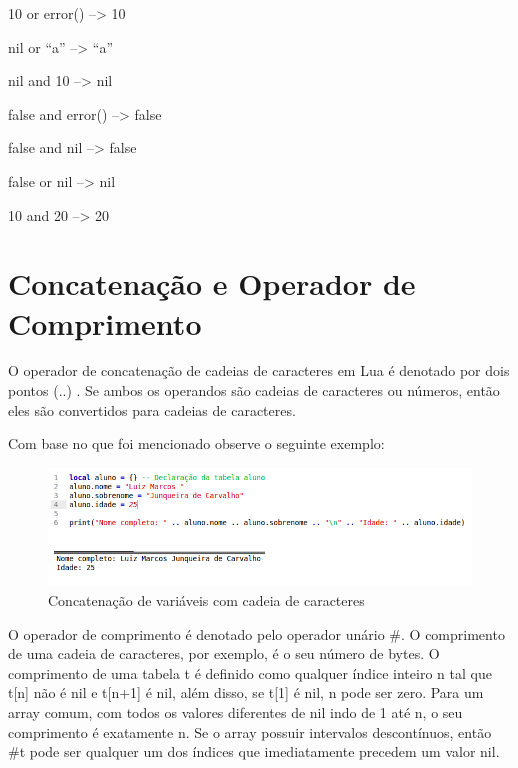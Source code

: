 \documentclass[
12pt, %
openright, %
oneside, %
a4paper, %
english, %
brazil, %
]{abntex2}
\begin{document}
10 or error()       --> 10

nil or ``a''        --> ``a''

nil and 10          --> nil

false and error()   --> false

false and nil       --> false

false or nil        --> nil

10 and 20           --> 20

\section{Concatenação e Operador de Comprimento}
O operador de concatenação de cadeias de caracteres em Lua é denotado por dois pontos (..) . Se ambos os operandos são cadeias de caracteres ou números, então eles são convertidos para cadeias de caracteres.

Com base no que foi mencionado observe o seguinte exemplo:

\begin{figure}[H]
\centering
\includegraphics[width=1\linewidth]{imagens/concatenacao.png}
\caption{Concatenação de variáveis com cadeia de caracteres}
\end{figure}

O operador de comprimento é denotado pelo operador unário \#. O comprimento de uma cadeia de caracteres, por exemplo, é o seu número de bytes. O comprimento de uma tabela t é definido como qualquer índice inteiro n tal que t[n] não é nil e t[n+1] é nil, além disso, se t[1] é nil, n pode ser zero. Para um array comum, com todos os valores diferentes de nil indo de 1 até n, o seu comprimento é exatamente n. Se o array possuir intervalos descontínuos, então \#t pode ser qualquer um dos índices que imediatamente precedem um valor nil.
\end{document}
